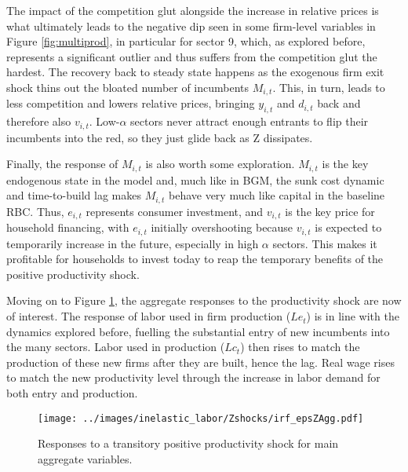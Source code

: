 \documentclass[a4paper,12pt]{article} %
\numberwithin{equation}{section} %
\numberwithin{figure}{section}
\numberwithin{table}{section}
\begin{document}
The impact of the competition glut alongside the increase in relative prices is what ultimately leads to the negative dip seen in some firm-level variables in
Figure \ref{fig:multiprod}, in particular for sector 9, which, as explored before, represents a significant outlier 
and thus suffers from the competition glut the hardest. The recovery back to steady state happens as the exogenous firm exit shock
thins out the bloated number of incumbents $M_{i,t}$. This, in turn, leads to less competition and lowers relative prices, bringing $y_{i,t}$ and $d_{i,t}$
back and therefore also $v_{i,t}$. Low-$\alpha$ sectors never attract enough entrants to flip their incumbents into the red, so they just glide
back as Z dissipates.

Finally, the response of $M_{i,t}$ is also worth some exploration. $M_{i,t}$ is the key endogenous state in the model and,
much like in BGM, the sunk cost dynamic and time-to-build lag makes $M_{i,t}$ behave very much like capital in the 
baseline RBC. Thus, $e_{i,t}$ represents consumer investment, and $v_{i,t}$ is the key price for household financing, with $e_{i,t}$ initially overshooting
because $v_{i,t}$ is expected to temporarily increase in the future, especially in high $\alpha$ sectors. This makes it profitable for households
to invest today to reap the temporary benefits of the positive productivity shock.

Moving on to Figure \ref{fig:aggprod}, the aggregate responses to the productivity shock are now of interest. The response of labor used in
firm production ($Le_t$) is in line with the dynamics explored before, fuelling the substantial entry of new incumbents into the many sectors.
Labor used in production ($Lc_t$) then rises to match the production of these new firms after they are built, hence the lag. Real wage rises to
match the new productivity level through the increase in labor demand for both entry and production.

\begin{figure}[H]
  \centering
  \texttt{[image: ../images/inelastic\_labor/Zshocks/irf\_epsZAgg.pdf]}
  \caption{Responses to a transitory positive productivity shock for main aggregate variables.}
  \label{fig:aggprod}
\end{figure}
\end{document}
